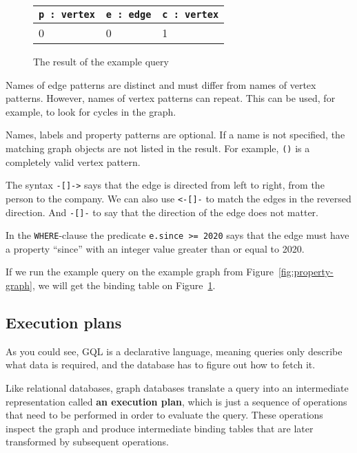 \documentclass[14pt]{constructor-thesis}
\theoremstyle{definition}
\begin{document}
\begin{figure}[b]
  \centering
  
  \begin{tabular}{ |p{3cm}|p{3cm}|p{3cm}|  }
    \hline
    \texttt{p : vertex} & \texttt{e : edge} & \texttt{c : vertex} \\
    \hline
    0 & 0 & 1 \\
    \hline
  \end{tabular}

  \caption{The result of the example query}
  \label{fig:example-query-binding-table}
\end{figure}

Names of edge patterns are distinct and must differ from names of vertex patterns. However, names of vertex patterns can repeat. This can be used, for example, to look for cycles in the graph.

Names, labels and property patterns are optional. If a name is not specified, the matching graph objects are not listed in the result. For example, \texttt{()} is a completely valid vertex pattern.

The syntax \texttt{-[]->} says that the edge is directed from left to right, from the person to the company. We can also use \texttt{<-[]-} to match the edges in the reversed direction. And \texttt{-[]-} to say that the direction of the edge does not matter.

In the \texttt{WHERE}-clause the predicate \verb+e.since >= 2020+ says that the edge must have a property ``since'' with an integer value greater than or equal to 2020.

If we run the example query on the example graph from Figure~\ref{fig:property-graph}, we will get the binding table on Figure~\ref{fig:example-query-binding-table}.

\subsection{Execution plans}

As you could see, GQL is a declarative language, meaning queries only describe what data is required, and the database has to figure out how to fetch it.

Like relational databases, graph databases translate a query into an intermediate representation called \textbf{an execution plan}, which is just a sequence of operations that need to be performed in order to evaluate the query. These operations inspect the graph and produce intermediate binding tables that are later transformed by subsequent operations.
\end{document}
